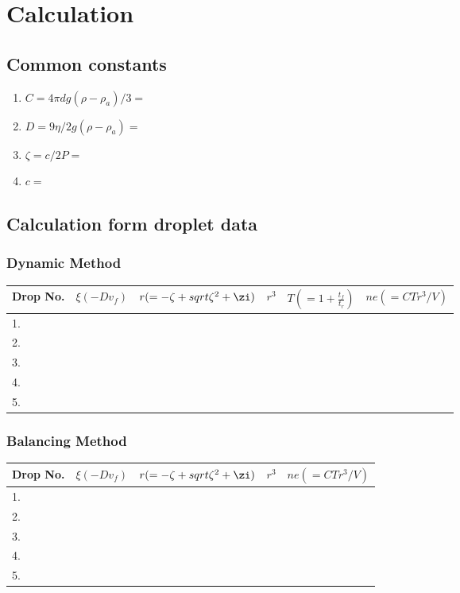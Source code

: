 \documentclass[%
sor,
 jor,
 amsmath,amssymb,
 reprint,%
]{revtex4-2}
\begin{document}
\section{Calculation}
\subsection{Common constants}
\begin{enumerate}
  \item $C=4\pi dg(\rho-\rho_a)/3 = $
  \item $D=9\eta /2g(\rho-\rho_a) = $
  \item $\zeta = c/2P = $
  \item $c = $
\end{enumerate}
\subsection{Calculation form droplet data}
\subsubsection{Dynamic Method}
\renewcommand{\arraystretch}{1.5} %
\setlength{\tabcolsep}{2pt} %
\begin{table}[H]
\centering
\begin{tabular}{|m{1cm}|m{3cm}|m{3cm}|m{3cm}|m{2cm}|m{3cm}|}
    \hline
    Drop No. & $\xi (-Dv_f)$  & $r(=-\zeta+sqrt{\zeta^2+\zi})$ & $r^3$ & $T \left(   = 1+ \frac{t_f}{ t_r}    \right)$  &  $ne (=CTr^3/V)$ \\
    \hline
    1.&  &  &  &  &  \\
    \hline
2.&  &  &  &  &  \\
    \hline
3.&  &  &  &  &  \\
    \hline
4.&  &  &  &  &  \\
    \hline
5.&  &  &  &  &  \\
    \hline
\end{tabular}
\end{table}

\subsubsection{Balancing Method}
\begin{table}[H]
\centering
\begin{tabular}{|m{1cm}|m{3cm}|m{3cm}|m{3cm}|m{3cm}|}
    \hline
    Drop No. & $\xi (-Dv_f)$  & $r(=-\zeta+sqrt{\zeta^2+\zi})$ & $r^3$ &  $ne (=CTr^3/V)$ \\
    \hline
    1.&    &  &  &  \\
    \hline
2.  &  &  &  &  \\
    \hline
3.  &  &  &  &  \\
    \hline
4.  &  &  &  &  \\
    \hline
5.  &  &  &  &  \\
    \hline
\end{tabular}
\end{table}
\end{document}
